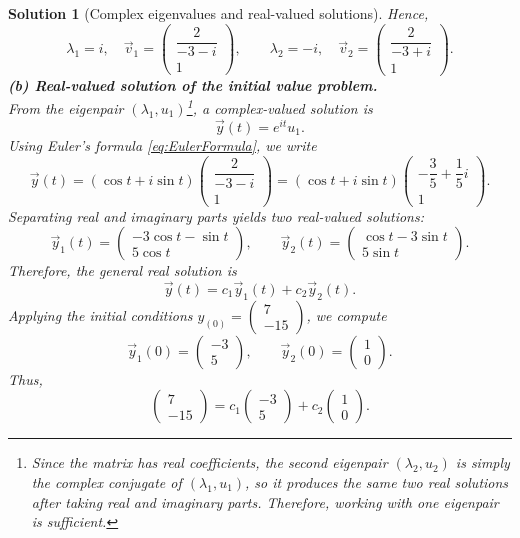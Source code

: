 \documentclass{article}
\newtheorem{solution}{Solution}
\begin{document}
\begin{solution}[Complex eigenvalues and real-valued solutions]
    Hence,
    \[\boxed{\lambda_1 = i,\quad \vec v_1 = \begin{pmatrix}
    \dfrac{2}{-3-i}\\1\end{pmatrix}, \qquad \lambda_2 = -i,\quad \vec v_2 = \begin{pmatrix}\dfrac{2}{-3+i} \\ 1\end{pmatrix}.}\]
    \textbf{(b) Real-valued solution of the initial value problem.}\\
    From the eigenpair $(\lambda_1,u_1)$\footnote{Since the matrix has real coefficients, the second eigenpair $(\lambda_2,u_2)$ is simply the complex conjugate of $(\lambda_1,u_1)$, so it produces the same two real solutions after taking real and imaginary parts. Therefore, working with one eigenpair is sufficient.}, a complex-valued solution is
    \[\vec y(t) = e^{it} u_1.\]
    Using Euler's formula \eqref{eq:EulerFormula}, we write
    \[\vec y(t) = (\cos t + i\sin t)\begin{pmatrix}\dfrac{2}{-3-i}\\1\end{pmatrix} = (\cos t + i\sin t)\begin{pmatrix}-\dfrac{3}{5} + \dfrac{1}{5}i\\1\end{pmatrix}.\]
    Separating real and imaginary parts yields two real-valued solutions:
    \[\vec y_1(t) = \begin{pmatrix}-3\cos t - \sin t \\ 5 \cos t\end{pmatrix}, \qquad \vec y_2(t) = \begin{pmatrix} \cos t - 3 \sin t \\ 5 \sin t\end{pmatrix}.\]
    Therefore, the general real solution is
    \[\vec y(t) = c_1 \vec y_1(t) + c_2 \vec y_2(t).\]
    Applying the initial conditions $y_(0)=\begin{pmatrix}7\\-15\end{pmatrix}$, we compute
    \[\vec y_1(0)=\begin{pmatrix}-3\\5\end{pmatrix}, \qquad \vec y_2(0)=\begin{pmatrix}1\\0\end{pmatrix}.\]
    Thus,
    \[\begin{pmatrix}7\\-15\end{pmatrix} = c_1\begin{pmatrix}-3\\5\end{pmatrix} + c_2\begin{pmatrix}1\\0\end{pmatrix}.\]

\end{solution}
\end{document}
